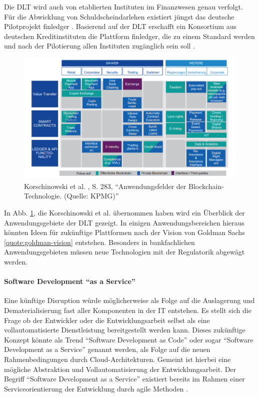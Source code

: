 Die \ac{DLT} wird auch von etablierten Instituten im Finanzwesen genau verfolgt.
Für die Abwicklung von Schuldscheindarlehen existiert jüngst das deutsche Pilotprojekt finledger \cite{finledger}. 
Basierend auf der \ac{DLT} erschafft ein Konsortium aus deutschen Kreditinstituten die Plattform finledger, die zu einem Standard werden und nach der Pilotierung allen Instituten zugänglich sein soll \cite{finledger}.

\begin{figure}[htbp]
 \centering
 \includegraphics[width=1.0\textwidth]{gfx/blockchainanwendung.PNG}
 \caption{Korschinowski et al. \cite{Korschinowski2018}, S. 283, \enquote{Anwendungsfelder der Blockchain-Technologie. (Quelle: KPMG)}\label{fig:blockchain}}
\end{figure}

In Abb. \ref{fig:blockchain}, die Korschinowski et al. \cite{Korschinowski2018} übernommen haben wird ein Überblick der Anwendungsgebiete der \ac{DLT} gezeigt. In einigen Anwendungsbereichen hieraus könnten Ideen für zukünftige Plattformen nach der Vision von Goldman Sachs \ref{quote:goldman-vision} entstehen. Besonders in bankfachlichen Anwendungsgebieten müssen neue Technologien mit der Regulatorik abgewägt werden.

\paragraph{Software Development \enquote{as a Service}}
\label{Disruption:DaaS}
Eine künftige Disruption würde möglicherweise als Folge auf die Auslagerung und Dematerialisierung fast aller Komponenten in der IT entstehen.
Es stellt sich die Frage ob der Entwickler oder die Entwicklungsarbeit selbst als eine vollautomatisierte Dienstleistung bereitgestellt werden kann. Dieses zukünftige Konzept könnte als Trend \enquote{Software Development as Code} oder sogar \enquote{Software Development as a Service} genannt werden, als Folge auf die neuen Rahmenbedingungen durch Cloud-Architekturen. Gemeint ist hierbei eine mögliche Abstraktion und Vollautomatisierung der Entwicklungsarbeit.
Der Begriff \enquote{Software Development as a Service} existiert bereits im Rahmen einer Serviceorientierung der Entwicklung durch agile Methoden \cite{Lehman:2011}.

